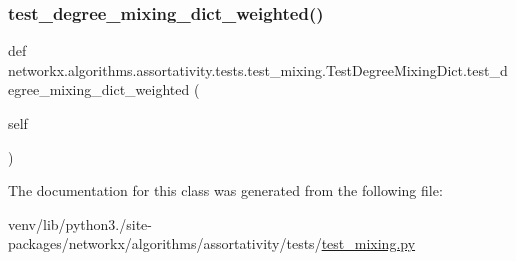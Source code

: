 \subsubsection{\texorpdfstring{test\+\_\+degree\+\_\+mixing\+\_\+dict\+\_\+weighted()}{test\_degree\_mixing\_dict\_weighted()}}
{\footnotesize\ttfamily def networkx.\+algorithms.\+assortativity.\+tests.\+test\+\_\+mixing.\+Test\+Degree\+Mixing\+Dict.\+test\+\_\+degree\+\_\+mixing\+\_\+dict\+\_\+weighted (\begin{DoxyParamCaption}\item[{}]{self }\end{DoxyParamCaption})}



The documentation for this class was generated from the following file\+:\begin{DoxyCompactItemize}
\item 
venv/lib/python3./site-\/packages/networkx/algorithms/assortativity/tests/\hyperlink{test__mixing_8py}{test\+\_\+mixing.\+py}\end{DoxyCompactItemize}
